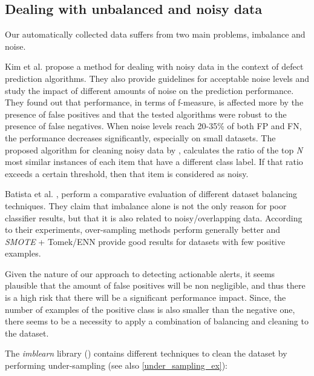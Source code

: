 \subsection{Dealing with unbalanced and noisy data}

Our automatically collected data suffers from two main problems, imbalance and noise. 

Kim et al. \cite{noise_defect} propose a method for dealing with noisy data in the context of defect prediction algorithms. They also provide guidelines for acceptable noise levels and study the impact of different amounts of noise on the prediction performance.
They found out that performance, in terms of f-measure, is affected more by the presence of false positives and that the tested algorithms were robust to the presence of false negatives. When noise levels reach 20-35\% of both FP and FN, the performance decreases significantly, especially on small datasets.
The proposed algorithm for cleaning noisy data by \cite{noise_defect}, calculates the ratio of the top \textit{N} most similar instances of each item that have a different class label. If that ratio exceeds a certain threshold, then that item is considered as noisy.

Batista et al. \cite{balancing_comparison}, perform a comparative evaluation of different dataset balancing techniques. They claim that imbalance alone is not the only reason for poor classifier results, but that it is also related to noisy/overlapping data. According to their experiments, over-sampling methods perform generally better and \textit{SMOTE} + Tomek/ENN provide good results for datasets with few positive examples.

Given the nature of our approach to detecting actionable alerts, it seems plausible that the amount of false positives will be non negligible, and thus there is a high risk that there will be a significant performance impact. Since, the number of examples of the positive class is also smaller than the negative one, there seems to be a necessity to apply a combination of balancing and cleaning to the dataset.

The \textit{imblearn} library (\cite{imblearn}) contains different techniques to clean the dataset by performing under-sampling (see also \cref{under_sampling_ex}):

